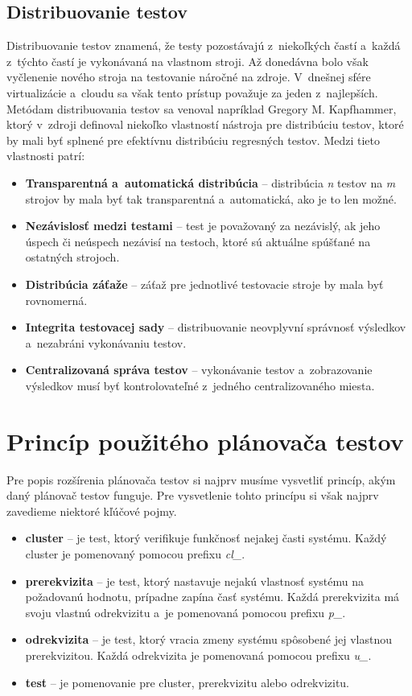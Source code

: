 \subsection*{Distribuovanie testov}
Distribuovanie testov znamená, že testy pozostávajú z~niekoľkých častí a~každá z~týchto častí je vykonávaná na vlastnom stroji.
Až donedávna bolo však vyčlenenie nového stroja na testovanie náročné na zdroje.
V~dnešnej sfére virtualizácie a~cloudu sa však tento prístup považuje za jeden z~najlepších.
Metódam distribuovania testov sa venoval napríklad Gregory M. Kapfhammer, ktorý v~zdroji \cite{Kapfhammer} definoval niekoľko
vlastností nástroja pre distribúciu testov, ktoré by mali byť splnené pre efektívnu distribúciu regresných testov.
Medzi tieto vlastnosti patrí:
\begin{itemize}
\item \textbf{Transparentná a~automatická distribúcia} -- distribúcia \emph{n} testov na \emph{m} strojov by mala byť tak transparentná a~automatická,
ako je to len možné.
\item \textbf{Nezávislosť medzi testami} -- test je považovaný za nezávislý, ak jeho úspech či neúspech nezávisí na testoch, ktoré
sú aktuálne spúšťané na ostatných strojoch. 
\item \textbf{Distribúcia záťaže} -- záťaž pre jednotlivé testovacie stroje by mala byť rovnomerná.
\item \textbf{Integrita testovacej sady} -- distribuovanie neovplyvní správnosť výsledkov a~nezabráni vykonávaniu testov.
\item \textbf{Centralizovaná správa testov} -- vykonávanie testov a~zobrazovanie výsledkov musí byť kontrolovateľné z~jedného centralizovaného miesta.
\end{itemize}




\section{Princíp použitého plánovača testov} \label{sekcia:planovac}
Pre popis rozšírenia plánovača testov si najprv musíme vysvetliť princíp, akým daný plánovač testov funguje.
Pre vysvetlenie tohto princípu si však najprv zavedieme niektoré kľúčové pojmy.
\begin{itemize}
\item \textbf{cluster} -- je test, ktorý verifikuje funkčnosť nejakej časti systému. Každý cluster je pomenovaný pomocou prefixu {\it cl\_}. 
\item \textbf{prerekvizita} -- je test, ktorý nastavuje nejakú vlastnosť systému na požadovanú hodnotu, prípadne zapína časť systému. 
Každá prerekvizita má svoju vlastnú odrekvizitu a~je pomenovaná pomocou prefixu {\it p\_}.
\item \textbf{odrekvizita} -- je test, ktorý vracia zmeny systému spôsobené jej vlastnou prerekvizitou. Každá odrekvizita je pomenovaná
pomocou prefixu {\it u\_}. 
\item \textbf{test} -- je pomenovanie pre cluster, prerekvizitu alebo odrekvizitu.
\end{itemize}

